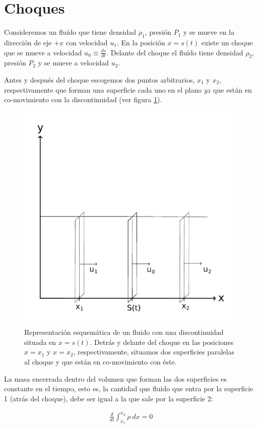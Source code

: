 \section{Choques}

Consideremos un fluído que tiene densidad $\rho_1$, presión $P_1$ y se mueve en la dirección de eje $+x$ con velocidad $u_1$. En la posición $x = s(t)$ existe un choque que se mueve a velocidad $u_0\equiv \frac{ds}{dt}$. Delante del choque el fluído tiene densidad $\rho_2$, presión $P_2$ y se mueve a velocidad $u_2$.

Antes y después del choque escogemos dos puntos arbitrarios, $x_1$ y $x_2$, respectivamente que forman una superficie cada uno en el plano $yz$ que están en co-movimiento con la discontinuidad (ver figura \ref{fig:shock}). 

\begin{figure}
  \includegraphics[width=0.7\linewidth]{./Figures/shock}
  \caption{Representación esquemática de un fluido con una discontinuidad situada en $x=s(t)$. Detrás y delante del choque en las posiciones $x=x_1$ y $x=x_2$, respectivamente, situamos dos superficies paralelas al choque y que están en co-movimiento con éste.}
  \label{fig:shock}
\end{figure}

La masa encerrada dentro del volumen que forman las dos superficies es constante en el tiempo, esto es, la cantidad que fluido que entra por la superficie 1 (atrás del choque), debe ser igual a la que sale por la superficie 2:

\begin{align}
  \frac{d}{dt}\int^{x_2}_{x_1} \rho~dx = 0 \label{eq:rho-dx}
\end{align}

